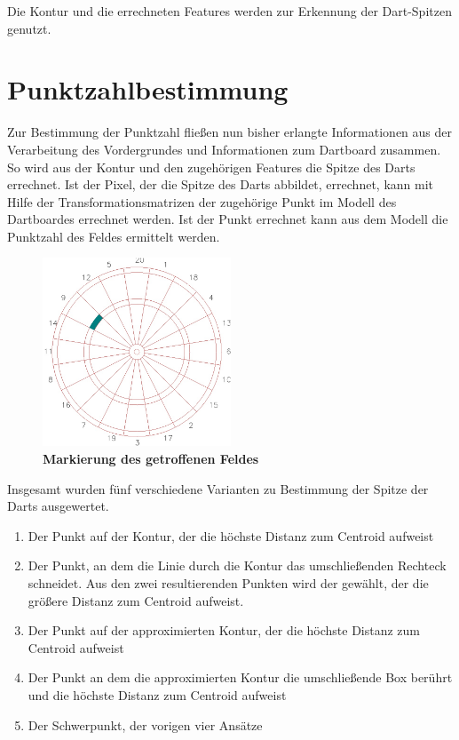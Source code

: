 Die Kontur und die errechneten Features werden zur Erkennung der Dart-Spitzen genutzt.

\section{Punktzahlbestimmung}
\label{sec:score}
Zur Bestimmung der Punktzahl fließen nun bisher erlangte Informationen aus der Verarbeitung des Vordergrundes  und Informationen zum Dartboard  zusammen.
So wird aus der Kontur und den zugehörigen Features die Spitze des Darts errechnet. Ist der Pixel, der die Spitze des Darts abbildet, errechnet, kann mit Hilfe der Transformationsmatrizen der zugehörige Punkt im Modell des Dartboardes errechnet werden. Ist der Punkt errechnet kann aus dem Modell die Punktzahl des Feldes ermittelt werden. 

\begin{figure}[ht]
\centering
\includegraphics[width=0.5\textwidth]{media/pointimg}
\caption{\textbf{Markierung des getroffenen Feldes}}
\label{Fig:acceptingimg}
\end{figure}

Insgesamt wurden fünf verschiedene Varianten zu Bestimmung der Spitze der Darts ausgewertet. 
\begin{enumerate}
	\item Der Punkt auf der Kontur, der die höchste Distanz zum Centroid aufweist
	\item Der Punkt, an dem die Linie durch die Kontur das umschließenden Rechteck schneidet. Aus den zwei resultierenden Punkten wird der gewählt, der die größere Distanz zum Centroid aufweist.
	\item Der Punkt auf der approximierten Kontur, der die höchste Distanz zum Centroid  aufweist
	\item Der Punkt an dem die approximierten Kontur die umschließende Box berührt und die höchste Distanz zum Centroid aufweist
	\item Der Schwerpunkt, der vorigen vier Ansätze
\end{enumerate}

